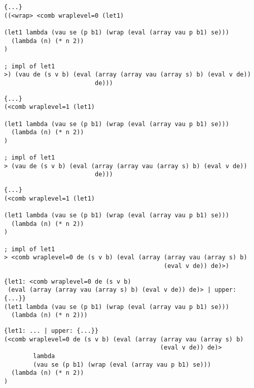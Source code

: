 \documentclass{beamer}
\begin{document}
\begin{frame}[fragile]
\footnotesize
\begin{verbatim}
{...}
((<wrap> <comb wraplevel=0 (let1)

(let1 lambda (vau se (p b1) (wrap (eval (array vau p b1) se)))
  (lambda (n) (* n 2))
)

; impl of let1
>) (vau de (s v b) (eval (array (array vau (array s) b) (eval v de))
                         de)))
\end{verbatim}
\end{frame}

\begin{frame}[fragile]
\footnotesize
\begin{verbatim}
{...}
(<comb wraplevel=1 (let1)

(let1 lambda (vau se (p b1) (wrap (eval (array vau p b1) se)))
  (lambda (n) (* n 2))
)

; impl of let1
> (vau de (s v b) (eval (array (array vau (array s) b) (eval v de))
                         de)))
\end{verbatim}
\end{frame}

\begin{frame}[fragile]
\footnotesize
\begin{verbatim}
{...}
(<comb wraplevel=1 (let1)

(let1 lambda (vau se (p b1) (wrap (eval (array vau p b1) se)))
  (lambda (n) (* n 2))
)

; impl of let1
> <comb wraplevel=0 de (s v b) (eval (array (array vau (array s) b)
                                            (eval v de)) de)>)
\end{verbatim}
\end{frame}

\begin{frame}[fragile]
\footnotesize
\begin{verbatim}
{let1: <comb wraplevel=0 de (s v b)
 (eval (array (array vau (array s) b) (eval v de)) de)> | upper: {...}}
(let1 lambda (vau se (p b1) (wrap (eval (array vau p b1) se)))
  (lambda (n) (* n 2)))
\end{verbatim}
\end{frame}

\begin{frame}[fragile]
\footnotesize
\begin{verbatim}
{let1: ... | upper: {...}}
(<comb wraplevel=0 de (s v b) (eval (array (array vau (array s) b)
                                           (eval v de)) de)>
		lambda
		(vau se (p b1) (wrap (eval (array vau p b1) se)))
  (lambda (n) (* n 2))
)
\end{verbatim}
\end{frame}
\end{document}

